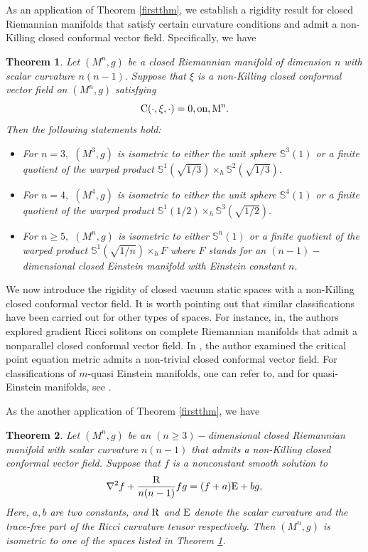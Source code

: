 \documentclass[10pt,leqno,oneside]{amsart}
\newtheorem{Thm}{Theorem}
\begin{document}
          As an application of Theorem \ref{firstthm}, we establish a rigidity result for closed Riemannian manifolds that satisfy certain curvature conditions and admit a non-Killing closed conformal vector field. Specifically, we have
    \begin{Thm}\label{Cxizero}
          Let $(M^n, g)$ be a closed Riemannian manifold of dimension $n$ with scalar curvature $n(n-1).$ Suppose that $\xi$ is a non-Killing closed conformal vector field on $(M^n, g)$ satisfying
          \[\rm{C}(\cdot,\xi,\cdot)=0,\text{on}, \text{M}^{\text{n}}.\]
          Then the following statements hold:
          \begin{itemize}[leftmargin=0.5cm, itemindent=0.4cm]
         \item[{\rm(1)}.] For $n=3,$ $(M^3, g)$ is isometric to either the unit sphere $\mathbb S^3(1)$ or a finite quotient of the warped product $\mathbb S^1(\sqrt{1/3})\times_h \mathbb{S}^{2}(\sqrt{1/3}).$
         \item[{\rm(2)}.] For $n=4,$ $(M^4, g)$ is isometric to either the unit sphere $\mathbb S^4(1)$ or a finite quotient of the warped product $\mathbb S^1(1/2)\times_h \mathbb{S}^{3}(\sqrt{1/2}).$
         \item[{\rm(3)}.] For $n\geq5,$ $(M^n, g)$ is isometric to either $\mathbb S^n(1)$ or a finite quotient of the warped product $\mathbb S^1(\sqrt{1/n})\times_h F$ where $F$ stands for an $(n-1)-$dimensional closed Einstein manifold with Einstein constant $n.$
       \end{itemize}
    \end{Thm}

          We now introduce the rigidity of closed vacuum static spaces with a non-Killing closed conformal vector field. It is worth pointing out that similar classifications have been carried out for other types of spaces. For instance, in\cite{DRF2017}, the authors explored gradient Ricci solitons on complete Riemannian manifolds that admit a nonparallel closed conformal vector field. In \cite{Filho2020}, the author examined the critical point equation metric admits a non-trivial closed conformal vector field. For classifications of \(m\)-quasi Einstein manifolds, one can refer to\cite{PSS2023RM}, and for quasi-Einstein manifolds, see \cite{Filho2024DG}.


          As the another application of Theorem \ref{firstthm}, we have
    \begin{Thm}\label{CSS1}
          Let $(M^n, g)$ be an $(n\ge3)-$dimensional closed Riemannian manifold with scalar curvature $n(n-1)$ that admits a non-Killing closed conformal vector field. Suppose that $f$ is a nonconstant smooth solution to
              \begin{equation}\label{MainEab}
                    \nabla^2f+\frac{{\rm{R}}}{n(n-1)}fg=(f+a){\rm E}+bg,
              \end{equation}
          Here, $a,b$ are two constants, and ${\rm R}$ and ${\rm E}$ denote the scalar curvature and the trace-free part of the Ricci curvature tensor respectively. Then $(M^n, g)$ is isometric to one of the spaces listed in Theorem {\rm\ref{Cxizero}}.
    \end{Thm}
\end{document}
